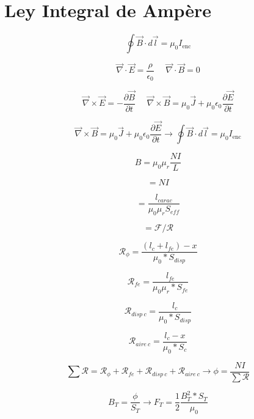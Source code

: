 \documentclass{article}
\begin{document}
\section*{Ley Integral de Ampère}

\huge
\[\oint \vec{B} \cdot d\vec{l} = \mu_0 I_{\text{enc}}\]

\[\vec{\nabla}\cdot \vec{E} = \frac{\rho}{\epsilon_0}~~~~~~\vec{\nabla}\cdot \vec{B} = 0\]

\[\vec{\nabla}\times\vec{E} = -\frac{\partial\vec{B}}{\partial t}~~~~~~\vec{\nabla}\times \vec{B} = \mu_0\vec{J}+\mu_0\epsilon_0\frac{\partial \vec{E}}{\partial t}\]


\[\vec{\nabla}\times \vec{B} = \mu_0\vec{J}+\mu_0\epsilon_0\frac{\partial \vec{E}}{\partial t} \rightarrow \oint \vec{B} \cdot d\vec{l} = \mu_0 I_{\text{enc}}\]


\[B = \mu_0\mu_r\frac{NI}{L}\]


\[=NI\]

\[=\frac{l_{carac}}{\mu_0\mu_r S_{eff}}\]

\[=\mathcal{F}/\mathcal{R}\]

\[\mathcal{R}_{\phi}=\frac{(l_c+l_{fe})-x}{\mu_0*S_{disp}}\]

\[\mathcal{R}_{fe}=\frac{l_{fe}}{\mu_0\mu_r*S_{fe}}\]

\[\mathcal{R}_{disp~c}=\frac{l_c}{\mu_0*S_{disp}}\]

\[\mathcal{R}_{aire~c}=\frac{l_c-x}{\mu_0*S_c}\]

\[\sum \mathcal{R}=\mathcal{R}_{\phi}+\mathcal{R}_{fe}+\mathcal{R}_{disp~c}+\mathcal{R}_{aire~c} \rightarrow \phi = \frac{NI}{\sum \mathcal{R}} \]

\[B_T=\frac{\phi}{S_T}\rightarrow F_T=\frac{1}{2}\frac{B_T^2*S_T}{\mu_0}\]
\end{document}
